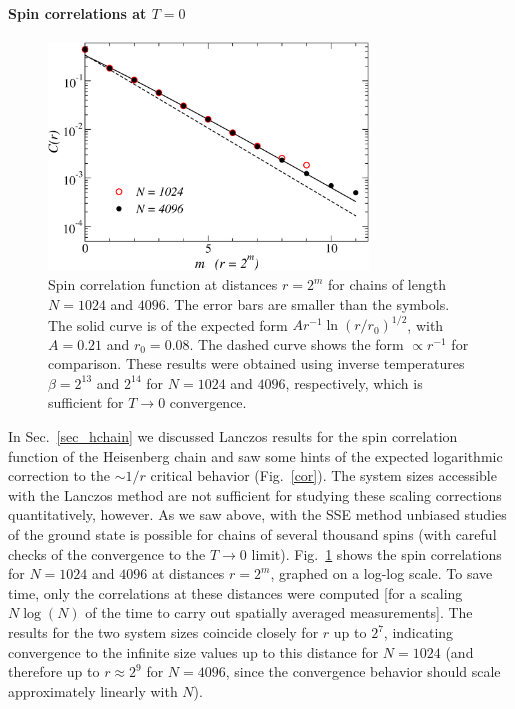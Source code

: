 \documentclass[draft,numberedheadings]{aipproc}
\begin{document}
\paragraph{Spin correlations at $T=0$}

\begin{figure}
\includegraphics[width=8.5cm, clip]{correl.eps}
\caption{Spin correlation function at distances $r=2^m$ for chains of length $N=1024$ and $4096$. The error bars are smaller than the symbols. The solid curve 
is of the expected form $Ar^{-1}\ln(r/r_0)^{1/2}$, with $A=0.21$ and $r_0=0.08$. The dashed curve shows the form $\propto r^{-1}$ for comparison. These results 
were obtained using inverse temperatures $\beta=2^{13}$ and $2^{14}$ for $N=1024$ and $4096$, respectively, which is sufficient for $T\to 0$ convergence.}
\label{crhchainsse}
\end{figure}

In Sec.~\ref{sec_hchain} we discussed Lanczos results for the spin correlation function of the Heisenberg chain and saw some hints of the expected logarithmic
correction to the $\sim 1/r$ critical behavior (Fig.~\ref{cor}). The system sizes accessible with the Lanczos method are not sufficient for studying these 
scaling corrections quantitatively, however. As we saw above, with the SSE method unbiased studies of the ground state is possible for chains of several 
thousand spins (with careful checks of the convergence  to the $T \to 0$ limit). Fig.~\ref{crhchainsse} shows the spin correlations for $N=1024$ and $4096$ 
at distances $r=2^m$, graphed on a log-log scale. To save time, only the correlations at these distances were computed [for a scaling $N\log(N)$ of the time
to carry out spatially averaged measurements]. The results for the two system sizes coincide closely for $r$ up to $2^7$, indicating convergence to the infinite 
size values up to this distance for $N=1024$ (and therefore up to $r \approx 2^9$ for $N=4096$, since the convergence behavior should scale approximately 
linearly with $N$). 
\end{document}
